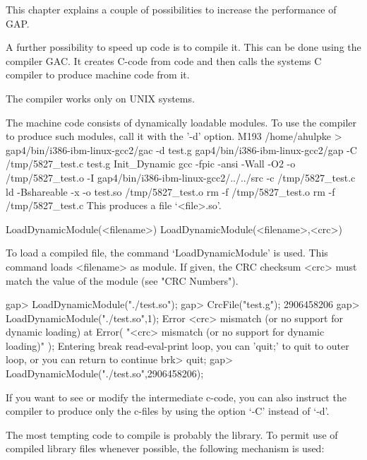 
This chapter explains a couple of possibilities to increase the performance
of GAP.


A further possibility to speed up code is to compile it. This can be done
using the {\GAP} compiler {\sf GAC}. It creates C-code from {\GAP} code and
then calls the systems C compiler to produce machine code from it.

The compiler works only on UNIX systems.

The machine code consists of dynamically loadable modules.
To use the compiler to produce such modules, call it with the '-d' option.
\begintt
M193 /home/ahulpke > gap4/bin/i386-ibm-linux-gcc2/gac -d test.g
gap4/bin/i386-ibm-linux-gcc2/gap -C /tmp/5827_test.c test.g Init_Dynamic
gcc -fpic -ansi -Wall -O2 -o /tmp/5827_test.o -I
gap4/bin/i386-ibm-linux-gcc2/../../src -c /tmp/5827_test.c
ld -Bshareable -x -o test.so /tmp/5827_test.o
rm -f /tmp/5827_test.o
rm -f /tmp/5827_test.c
\endtt
This produces a file `<file>.so'.

\>LoadDynamicModule(<filename>)
\)LoadDynamicModule(<filename>,<crc>)

To load a compiled file, the command `LoadDynamicModule' is used. This
command loads <filename> as module. If given, the CRC checksum <crc> must
match the value of the module (see "CRC Numbers").

\begintt
gap> LoadDynamicModule("./test.so");
gap> CrcFile("test.g");
2906458206
gap> LoadDynamicModule("./test.so",1);
Error <crc> mismatch (or no support for dynamic loading) at
Error( "<crc> mismatch (or no support for dynamic loading)" );
Entering break read-eval-print loop, you can 'quit;' to quit to outer loop,
or you can return to continue
brk> quit;
gap> LoadDynamicModule("./test.so",2906458206);
\endtt

If you want to see or modify the intermediate c-code, you can also instruct
the compiler to produce only the c-files by using the option `-C' instead of
`-d'.


The most tempting code to compile is probably the library. To permit use of
compiled library files whenever possible, the following mechanism is used:

